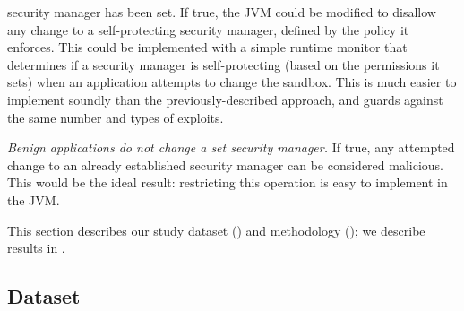 \documentclass{sig-alternate}
\begin{document}
\begin{flushenum}
{    security manager has been set}. If true, the JVM could be modified to
  disallow any change to a self-protecting security manager, defined by the
  policy it enforces.  This could be implemented with a simple runtime monitor that
  determines if a security manager is self-protecting (based on the permissions
  it sets) when an application
  attempts to change the sandbox. This is much easier to implement soundly than
  the previously-described approach, and guards against the same number and types of
  exploits.
\item \textit{Benign applications do not change a set security manager.} If
  true, any attempted change to an already established security manager can be
  considered malicious. This would be the ideal result: restricting this
  operation is easy to implement in the JVM.
\end{flushenum}

\noindent This section describes our study dataset () and
methodology (); we describe results in . 

\subsection{Dataset}\label{sec:Applications-Studied}
\end{document}
